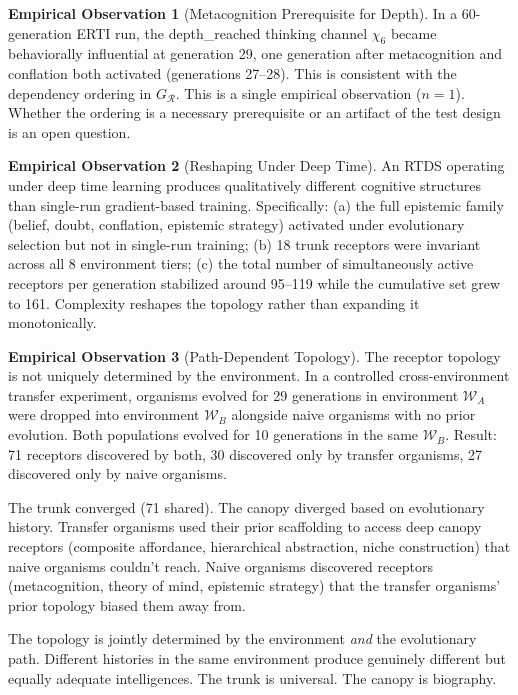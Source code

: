 \documentclass[12pt]{article}
\theoremstyle{definition}
\newtheorem{observation}{Empirical Observation}
\begin{document}
\begin{observation}[Metacognition Prerequisite for Depth]
In a 60-generation ERTI run, the depth\_reached thinking channel $\chi_6$ became
behaviorally influential at generation 29, one generation after metacognition and
conflation both activated (generations 27--28). This is consistent with the dependency
ordering in $G_\mathcal{R}$. This is a single empirical observation ($n=1$).
Whether the ordering is a necessary prerequisite or an artifact of the test design
is an open question.
\end{observation}

\begin{observation}[Reshaping Under Deep Time]
An RTDS operating under deep time learning produces qualitatively different cognitive
structures than single-run gradient-based training. Specifically: (a) the full
epistemic family (belief, doubt, conflation, epistemic strategy) activated under
evolutionary selection but not in single-run training; (b) 18 trunk receptors were
invariant across all 8 environment tiers; (c) the total number of simultaneously
active receptors per generation stabilized around 95--119 while the cumulative set
grew to 161. Complexity reshapes the topology rather than expanding it monotonically.
\end{observation}

\begin{observation}[Path-Dependent Topology]
The receptor topology is not uniquely determined by the environment. In a controlled
cross-environment transfer experiment, organisms evolved for 29 generations in
environment $\mathcal{W}_A$ were dropped into environment $\mathcal{W}_B$ alongside
naive organisms with no prior evolution. Both populations evolved for 10 generations
in the same $\mathcal{W}_B$. Result: 71 receptors discovered by both, 30 discovered
only by transfer organisms, 27 discovered only by naive organisms.

The trunk converged (71 shared). The canopy diverged based on evolutionary history.
Transfer organisms used their prior scaffolding to access deep canopy receptors
(composite affordance, hierarchical abstraction, niche construction) that naive
organisms couldn't reach. Naive organisms discovered receptors (metacognition,
theory of mind, epistemic strategy) that the transfer organisms' prior topology
biased them away from.

The topology is jointly determined by the environment \emph{and} the evolutionary
path. Different histories in the same environment produce genuinely different
but equally adequate intelligences. The trunk is universal. The canopy is biography.
\end{observation}
\end{document}
